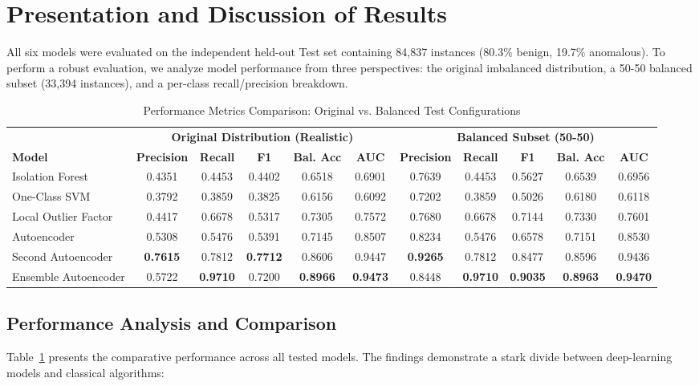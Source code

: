 \section{Presentation and Discussion of Results}

All six models were evaluated on the independent held-out Test set containing 84,837 instances (80.3\% benign, 19.7\% anomalous). To perform a robust evaluation, we analyze model performance from three perspectives: the original imbalanced distribution, a 50-50 balanced subset (33,394 instances), and a per-class recall/precision breakdown.

\begin{table}[t]
  \centering
  \caption{Performance Metrics Comparison: Original vs. Balanced Test Configurations}
  \label{tab:final_results}
  \small
  \begin{tabular}{lccccc|ccccc}
    \toprule
    & \multicolumn{5}{c|}{\textbf{Original Distribution (Realistic)}} & \multicolumn{5}{c}{\textbf{Balanced Subset (50-50)}} \\
    \textbf{Model} & \textbf{Precision} & \textbf{Recall} & \textbf{F1} & \textbf{Bal. Acc} & \textbf{AUC} & \textbf{Precision} & \textbf{Recall} & \textbf{F1} & \textbf{Bal. Acc} & \textbf{AUC} \\
    \midrule
    Isolation Forest & 0.4351 & 0.4453 & 0.4402 & 0.6518 & 0.6901 & 0.7639 & 0.4453 & 0.5627 & 0.6539 & 0.6956 \\
    One-Class SVM    & 0.3792 & 0.3859 & 0.3825 & 0.6156 & 0.6092 & 0.7202 & 0.3859 & 0.5026 & 0.6180 & 0.6118 \\
    Local Outlier Factor & 0.4417 & 0.6678 & 0.5317 & 0.7305 & 0.7572 & 0.7680 & 0.6678 & 0.7144 & 0.7330 & 0.7601 \\
    Autoencoder      & 0.5308 & 0.5476 & 0.5391 & 0.7145 & 0.8507 & 0.8234 & 0.5476 & 0.6578 & 0.7151 & 0.8530 \\
    Second Autoencoder & \textbf{0.7615} & 0.7812 & \textbf{0.7712} & 0.8606 & 0.9447 & \textbf{0.9265} & 0.7812 & 0.8477 & 0.8596 & 0.9436 \\
    Ensemble Autoencoder & 0.5722 & \textbf{0.9710} & 0.7200 & \textbf{0.8966} & \textbf{0.9473} & 0.8448 & \textbf{0.9710} & \textbf{0.9035} & \textbf{0.8963} & \textbf{0.9470} \\
    \bottomrule
  \end{tabular}
\end{table}

\subsection{Performance Analysis and Comparison}
Table~\ref{tab:final_results} presents the comparative performance across all tested models. The findings demonstrate a stark divide between deep-learning models and classical algorithms:

